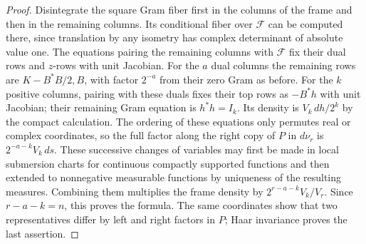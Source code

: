 \documentclass[a4paper,11pt]{article}
\theoremstyle{definition}
\theoremstyle{remark}
\numberwithin{equation}{section}
\begin{document}
\begin{proof}
Disintegrate the square Gram fiber first in the columns of the
frame and then in the remaining columns. Its conditional fiber
over \(\mathcal F\) can be computed there, since translation
by any isometry has complex determinant of absolute value one.
The equations pairing the remaining columns with \(\mathcal F\)
fix their dual rows and \(z\)-rows with unit Jacobian. For the
\(a\) dual columns the remaining rows are \(K-B^*B/2,B\),
with factor \(2^{-a}\) from their zero Gram as before.
For the \(k\) positive columns, pairing with these duals fixes
their top rows as \(-B^*h\) with unit Jacobian; their remaining
Gram equation is \(h^*h=I_k\). Its density is \(V_k\,dh/2^k\)
by the compact calculation. The ordering of these equations
only permutes real or complex coordinates, so the full
factor along the right copy of \(P\) in \(d\nu_r\) is
\(2^{-a-k}V_k\,ds\). These successive changes of variables
may first be made in local submersion charts for continuous
compactly supported functions and then extended to nonnegative
measurable functions by uniqueness of the resulting measures.
Combining them multiplies the frame density by
\(2^{r-a-k}V_k/V_r\). Since \(r-a-k=n\), this proves the formula.
The same coordinates show that two representatives differ by
left and right factors in \(P\); Haar invariance proves the
last assertion.
\end{proof}
\end{document}
